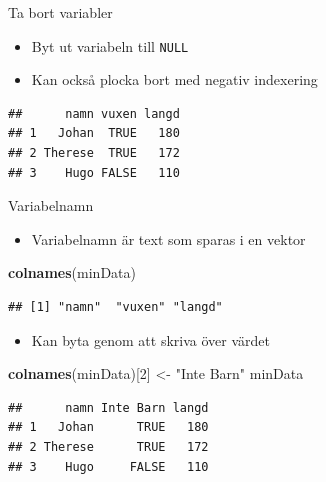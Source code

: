 \documentclass[
  11pt,
  ignorenonframetext,
]{beamer}
\newenvironment{Shaded}{\begin{snugshade}}{\end{snugshade}}
\newcommand{\DecValTok}[1]{\textcolor[rgb]{0.00,0.00,0.81}{#1}}
\newcommand{\KeywordTok}[1]{\textcolor[rgb]{0.13,0.29,0.53}{\textbf{#1}}}
\newcommand{\NormalTok}[1]{#1}
\newcommand{\OperatorTok}[1]{\textcolor[rgb]{0.81,0.36,0.00}{\textbf{#1}}}
\newcommand{\OtherTok}[1]{\textcolor[rgb]{0.56,0.35,0.01}{#1}}
\newcommand{\StringTok}[1]{\textcolor[rgb]{0.31,0.60,0.02}{#1}}
\providecommand{\tightlist}{%
  \setlength{\itemsep}{0pt}\setlength{\parskip}{0pt}}
\begin{document}
\begin{frame}[fragile]{Ta bort variabler}
\protect\hypertarget{ta-bort-variabler}{}
\begin{itemize}
\tightlist
\item
  Byt ut variabeln till \texttt{NULL}
\item
  Kan också plocka bort med negativ indexering
\end{itemize}

\begin{Shaded}
\end{Shaded}

\begin{verbatim}
##      namn vuxen langd
## 1   Johan  TRUE   180
## 2 Therese  TRUE   172
## 3    Hugo FALSE   110
\end{verbatim}
\end{frame}

\begin{frame}[fragile]{Variabelnamn}
\protect\hypertarget{variabelnamn}{}
\begin{itemize}
\tightlist
\item
  Variabelnamn är text som sparas i en vektor
\end{itemize}

\begin{Shaded}
\begin{Highlighting}[]
\KeywordTok{colnames}\NormalTok{(minData)}
\end{Highlighting}
\end{Shaded}

\begin{verbatim}
## [1] "namn"  "vuxen" "langd"
\end{verbatim}

\pause

\begin{itemize}
\tightlist
\item
  Kan byta genom att skriva över värdet
\end{itemize}

\begin{Shaded}
\begin{Highlighting}[]
\KeywordTok{colnames}\NormalTok{(minData)[}\DecValTok{2}\NormalTok{] \textless{}{-}}\StringTok{ "Inte Barn"}
\NormalTok{minData}
\end{Highlighting}
\end{Shaded}

\begin{verbatim}
##      namn Inte Barn langd
## 1   Johan      TRUE   180
## 2 Therese      TRUE   172
## 3    Hugo     FALSE   110
\end{verbatim}
\end{frame}
\end{document}
